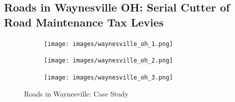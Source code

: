 \subsection{Roads in Waynesville OH: Serial Cutter of Road Maintenance Tax Levies}


\begin{figure}[ht]
    \centering
    \begin{minipage}[b]{0.48\textwidth}
        \centering
        \begin{subfigure}[b]{0.75\textwidth}  %
            \centering
            \texttt{[image: images/waynesville\_oh\_1.png]}
            \label{fig:w_oh_1}
        \end{subfigure}
    \end{minipage}
    \hfill
    \begin{minipage}[b]{0.48\textwidth}
        \centering
        \begin{subfigure}[b]{0.75\textwidth}  %
            \centering
            \texttt{[image: images/waynesville\_oh\_2.png]}
            \label{fig:w_oh_2}
        \end{subfigure}
    \end{minipage}

    \vspace{1em}

    \begin{minipage}[b]{0.48\textwidth}
        \centering
        \begin{subfigure}[b]{0.75\textwidth}  %
            \centering
            \texttt{[image: images/waynesville\_oh\_3.png]}
            \label{fig:w_oh_3}
        \end{subfigure}
    \end{minipage}

    \caption{Roads in Waynesville: Case Study}
    \label{fig:rd_waynesville}
\end{figure}
